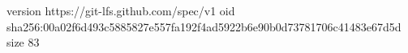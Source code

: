 version https://git-lfs.github.com/spec/v1
oid sha256:00a02f6d493c5885827e557fa192f4ad5922b6e90b0d73781706c41483e67d5d
size 83
